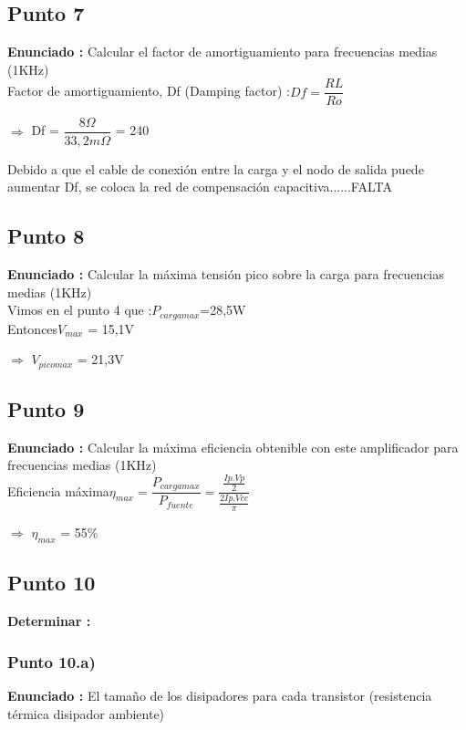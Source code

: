 \documentclass[12pt]{book}
\begin{document}
\subsection{Punto 7}
\textbf{Enunciado : } Calcular el factor de amortiguamiento para frecuencias medias (1KHz)\\[1cm]

Factor de amortiguamiento, Df (Damping factor) :\qquad $Df=\dfrac{RL}{Ro}$\\
\begin{center}
$\Longrightarrow$  Df = $\dfrac{8\Omega}{33,2m\Omega}$ = 240
\end{center}
Debido a que el cable de conexión entre la carga y el nodo de salida puede aumentar Df, se coloca la red de compensación capacitiva......FALTA

\subsection{Punto 8}
\textbf{Enunciado : } Calcular la máxima tensión pico sobre la carga para frecuencias medias (1KHz)\\[1cm]
Vimos en el punto 4 que :\quad $P_{cargamax}$=28,5W\\[0.25cm]
Entonces\quad $V_{max}$ = 15,1V
\begin{center}
$\Longrightarrow$  $V_{picomax}$ = 21,3V
\end{center}

\subsection{Punto 9}
\textbf{Enunciado : } Calcular la máxima eficiencia obtenible con este amplificador para frecuencias medias (1KHz)\\[1cm]
Eficiencia máxima\quad $\eta_{max}=\dfrac{P_{cargamax}}{P_{fuente}}=\dfrac{\frac{Ip.Vp}{2}}{\frac{2 Ip.Vcc}{\pi}}$
\begin{center}
$\Longrightarrow$  $\eta_{max}$ = 55\%
\end{center}

\subsection{Punto 10}
\textbf{Determinar : }\\

\subsubsection{Punto 10.a)}
\textbf{Enunciado : } El tamaño de los disipadores para cada transistor (resistencia térmica disipador ambiente)\\[1cm]
\end{document}
